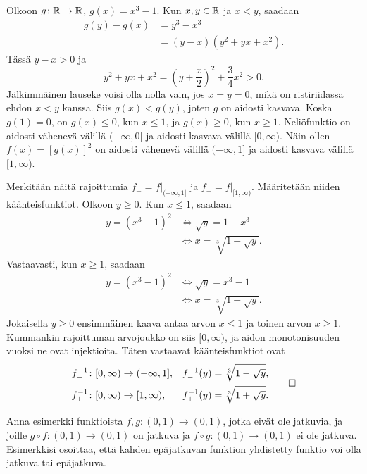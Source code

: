 \documentclass[11pt,a4paper]{amsart}
\begin{document}
\begin{solution}
  Olkoon \(g \colon \mathbb{R} \to \mathbb{R}\), \(g(x) = x^3 - 1\). Kun
  \(x, y \in \mathbb{R}\) ja \(x < y\), saadaan
  \[
    \begin{aligned}
      g(y) - g(x) &= y^3 - x^3 \\
      &= (y - x)(y^2 + yx + x^2).
    \end{aligned}
  \]
  Tässä \(y - x > 0\) ja
  \[
    y^2 + yx + x^2 = \left(y + \frac{x}{2}\right)^2 + \frac{3}{4}x^2 > 0.
  \]
  Jälkimmäinen lauseke voisi olla nolla vain, jos \(x = y = 0\), mikä on
  ristiriidassa ehdon \(x < y\) kanssa. Siis \(g(x) < g(y)\), joten \(g\)
  on aidosti kasvava.
  Koska \(g(1) = 0\), on \(g(x) \leq 0\), kun \(x \leq 1\), ja
  \(g(x) \geq 0\), kun \(x \geq 1\).
  Neliöfunktio on aidosti vähenevä välillä \((-\infty, 0]\) ja aidosti
  kasvava välillä \([0, \infty)\). Näin ollen \(f(x) = [g(x)]^2\) on
  aidosti vähenevä välillä \((-\infty, 1]\) ja aidosti kasvava välillä
  \([1, \infty)\).

  Merkitään näitä rajoittumia \(f_- = f|_{(-\infty, 1]}\) ja
  \(f_+ = f|_{[1, \infty)}\). Määritetään niiden käänteisfunktiot.
  Olkoon \(y \geq 0\). Kun \(x \leq 1\), saadaan
  \[
    \begin{aligned}
      y = (x^3 - 1)^2
      &\iff \sqrt{y} = 1 - x^3 \\
      &\iff x = \sqrt[3]{1 - \sqrt{y}}.
    \end{aligned}
  \]
  Vastaavasti, kun \(x \geq 1\), saadaan
  \[
    \begin{aligned}
      y = (x^3 - 1)^2
      &\iff \sqrt{y} = x^3 - 1 \\
      &\iff x = \sqrt[3]{1 + \sqrt{y}}.
    \end{aligned}
  \]
  Jokaisella \(y \geq 0\) ensimmäinen kaava antaa arvon \(x \leq 1\) ja
  toinen arvon \(x \geq 1\). Kummankin rajoittuman arvojoukko on siis
  \([0, \infty)\), ja aidon monotonisuuden vuoksi ne ovat injektioita.
  Täten vastaavat käänteisfunktiot ovat
  \[
    \begin{aligned}
      f_-^{-1} &\colon [0, \infty) \to (-\infty, 1],
      & f_-^{-1}(y) &= \sqrt[3]{1 - \sqrt{y}}, \\
      f_+^{-1} &\colon [0, \infty) \to [1, \infty),
      & f_+^{-1}(y) &= \sqrt[3]{1 + \sqrt{y}}.
    \end{aligned}
    \qedhere
  \]
\end{solution}

\begin{exercise}
  Anna esimerkki funktioista \(f, g \colon (0, 1) \to (0, 1)\), jotka eivät
  ole jatkuvia, ja joille \(g \circ f \colon (0, 1) \to (0, 1)\) on jatkuva
  ja \(f \circ g \colon (0, 1) \to (0, 1)\) ei ole jatkuva. Esimerkkisi
  osoittaa, että kahden epäjatkuvan funktion yhdistetty funktio voi olla
  jatkuva tai epäjatkuva.
\end{exercise}
\end{document}
